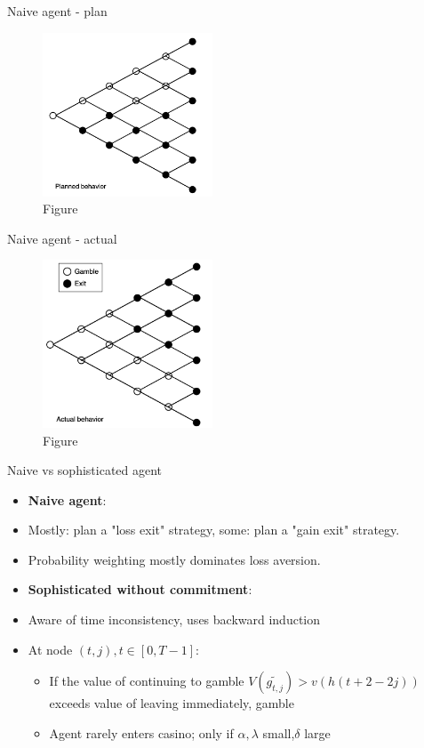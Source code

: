 \documentclass[11pt, aspectratio=169]{beamer}
\begin{document}
\begin{frame}{Naive agent - plan}
\begin{figure}
\centering
    \includegraphics[width = 0.45\textwidth]{naive_plan.png}
    \caption{Figure \citet{Barberis2012a}}
    \end{figure}
\end{frame}

\begin{frame}{Naive agent - actual}
\begin{figure}
\centering
    \includegraphics[width = 0.45\textwidth]{naive_final.png}
    \caption{Figure \citet{Barberis2012a}}
    \end{figure}
\end{frame}


\begin{frame}{Naive vs sophisticated agent}
    \begin{itemize}
    	\item \textbf{Naive agent}:\medskip
        \item Mostly: plan a "loss exit" strategy, some: plan a "gain exit" strategy.\medskip
        \item Probability weighting mostly  dominates loss aversion.\bigskip
  	\item \textbf{Sophisticated without commitment}:\medskip
        \item Aware of time inconsistency, uses backward induction\medskip
        \item At node $(t, j), t \in [0,T-1]$:\medskip
        \begin{itemize}
        \item If the value of continuing to gamble $V(\tilde{g_{t,j}}) > v(h(t+2-2j))$ exceeds value of leaving immediately, gamble\medskip
        \item Agent rarely enters casino; only if  $\alpha,\lambda $ small,$\delta$ large\medskip
        \end{itemize}
    \end{itemize}
\end{frame}
\end{document}
